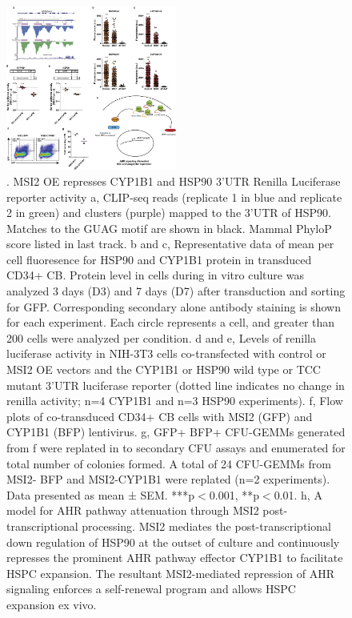 \begin{figure}[ht]
  \centering
  \includegraphics[width=0.5\textwidth]{chapter_4_figures/Figure_S10}
  \caption[Supplementary Figure 4]{. MSI2 OE represses CYP1B1 and HSP90 3'UTR Renilla Luciferase reporter activity a, CLIP-seq reads (replicate 1 in blue and replicate 2 in green) and clusters (purple) mapped to the 3'UTR of HSP90. Matches to the GUAG motif are shown in black. Mammal PhyloP score listed in last track. b and c, Representative data of mean per cell fluoresence for HSP90 and CYP1B1 protein in transduced CD34+ CB. Protein level in cells during in vitro culture was analyzed 3 days (D3) and 7 days (D7) after transduction and sorting for GFP. Corresponding secondary alone antibody staining is shown for each experiment. Each circle represents a cell, and greater than 200 cells were analyzed per condition. d and e, Levels of renilla luciferase activity in NIH-3T3 cells co-transfected with control or MSI2 OE vectors and the CYP1B1 or HSP90 wild type or TCC mutant 3'UTR luciferase reporter (dotted line indicates no change in renilla activity; n=4 CYP1B1 and n=3 HSP90 experiments). f, Flow plots of co-transduced CD34+ CB cells with MSI2 (GFP) and CYP1B1 (BFP) lentivirus. g, GFP+ BFP+ CFU-GEMMs generated from f were replated in to secondary CFU assays and enumerated for total number of colonies formed. A total of 24 CFU-GEMMs from MSI2- BFP and MSI2-CYP1B1 were replated (n=2 experiments). Data presented as mean ± SEM. ***p$<$0.001, **p$<$0.01. h, A model for AHR pathway attenuation through MSI2 post- transcriptional processing. MSI2 mediates the post-transcriptional down regulation of HSP90 at the outset of culture and continuously represses the prominent AHR pathway effector CYP1B1 to facilitate HSPC expansion. The resultant MSI2-mediated repression of AHR signaling enforces a self-renewal program and allows HSPC expansion ex vivo. }
  \label{fig:Figure_S4}
\end{figure}

